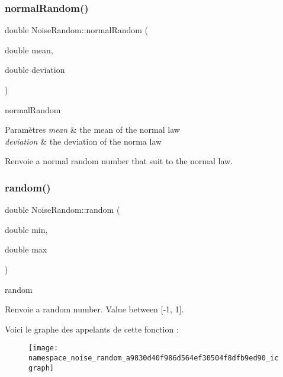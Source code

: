 \subsubsection{\texorpdfstring{normal\+Random()}{normalRandom()}}
{\footnotesize\ttfamily double Noise\+Random\+::normal\+Random (\begin{DoxyParamCaption}\item[{double}]{mean,  }\item[{double}]{deviation }\end{DoxyParamCaption})}



normal\+Random 


\begin{DoxyParams}{Paramètres}
{\em mean} & the mean of the normal law \\
\hline
{\em deviation} & the deviation of the norma law \\
\hline
\end{DoxyParams}
\begin{DoxyReturn}{Renvoie}
a normal random number that suit to the normal law. 
\end{DoxyReturn}
\mbox{\label{namespace_noise_random_a9830d40f986d564ef30504f8dfb9ed90}} 
\subsubsection{\texorpdfstring{random()}{random()}}
{\footnotesize\ttfamily double Noise\+Random\+::random (\begin{DoxyParamCaption}\item[{double}]{min,  }\item[{double}]{max }\end{DoxyParamCaption})}



random 

\begin{DoxyReturn}{Renvoie}
a random number. Value between \mbox{[}-\/1, 1\mbox{]}. 
\end{DoxyReturn}
Voici le graphe des appelants de cette fonction \+:\nopagebreak
\begin{figure}[H]
\begin{center}
\leavevmode
\texttt{[image: namespace\_noise\_random\_a9830d40f986d564ef30504f8dfb9ed90\_icgraph]}
\end{center}
\end{figure}
